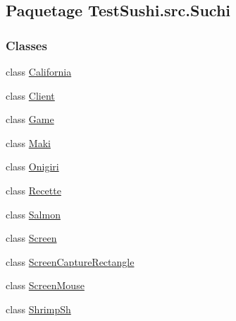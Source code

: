 \hypertarget{namespaceTestSushi_1_1src_1_1Suchi}{}\subsection{Paquetage Test\+Sushi.\+src.\+Suchi}
\label{namespaceTestSushi_1_1src_1_1Suchi}
\subsubsection*{Classes}
\begin{DoxyCompactItemize}
\item 
class \hyperlink{classTestSushi_1_1src_1_1Suchi_1_1California}{California}
\item 
class \hyperlink{classTestSushi_1_1src_1_1Suchi_1_1Client}{Client}
\item 
class \hyperlink{classTestSushi_1_1src_1_1Suchi_1_1Game}{Game}
\item 
class \hyperlink{classTestSushi_1_1src_1_1Suchi_1_1Maki}{Maki}
\item 
class \hyperlink{classTestSushi_1_1src_1_1Suchi_1_1Onigiri}{Onigiri}
\item 
class \hyperlink{classTestSushi_1_1src_1_1Suchi_1_1Recette}{Recette}
\item 
class \hyperlink{classTestSushi_1_1src_1_1Suchi_1_1Salmon}{Salmon}
\item 
class \hyperlink{classTestSushi_1_1src_1_1Suchi_1_1Screen}{Screen}
\item 
class \hyperlink{classTestSushi_1_1src_1_1Suchi_1_1ScreenCaptureRectangle}{Screen\+Capture\+Rectangle}
\item 
class \hyperlink{classTestSushi_1_1src_1_1Suchi_1_1ScreenMouse}{Screen\+Mouse}
\item 
class \hyperlink{classTestSushi_1_1src_1_1Suchi_1_1ShrimpSh}{Shrimp\+Sh}
\end{DoxyCompactItemize}
